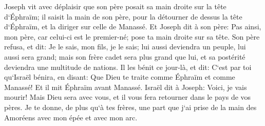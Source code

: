 \verse Joseph vit avec déplaisir que son père posait sa main droite sur la tête d`Éphraïm; il saisit la main de son père, pour la détourner de dessus la tête d`Éphraïm, et la diriger sur celle de Manassé. 
\verse Et Joseph dit à son père: Pas ainsi, mon père, car celui-ci est le premier-né; pose ta main droite sur sa tête. 
\verse Son père refusa, et dit: Je le sais, mon fils, je le sais; lui aussi deviendra un peuple, lui aussi sera grand; mais son frère cadet sera plus grand que lui, et sa postérité deviendra une multitude de nations. 
\verse Il les bénit ce jour-là, et dit: C`est par toi qu`Israël bénira, en disant: Que Dieu te traite comme Éphraïm et comme Manassé! Et il mit Éphraïm avant Manassé. 
\verse Israël dit à Joseph: Voici, je vais mourir! Mais Dieu sera avec vous, et il vous fera retourner dans le pays de vos pères. 
\verse Je te donne, de plus qu`à tes frères, une part que j`ai prise de la main des Amoréens avec mon épée et avec mon arc. 

\chapter{}

